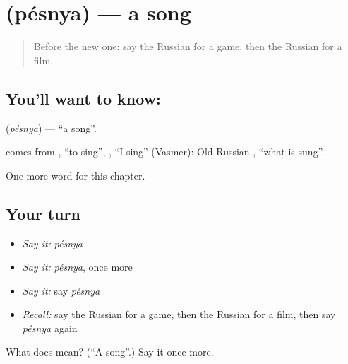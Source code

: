 \section[\texorpdfstring{\ru{песня} (pésnya)}{песня (pésnya)}]{ (pésnya) — a song}

\label{lesson:RU-C113-song}



\begin{quote}
Before the new one: say the Russian for a game, then the Russian for a film.
\end{quote}

\subsection*{You'll want to know: }
\textbf{} (\emph{pésnya}) — \textquotedblleft{}a song\textquotedblright{}.

\begin{cousinweb}
\textbf{} comes from \emph{}, \textquotedblleft{}to sing\textquotedblright{}, \emph{}, \textquotedblleft{}I sing\textquotedblright{} (Vasmer): Old Russian \emph{}, \textquotedblleft{}what is sung\textquotedblright{}.
\end{cousinweb}

\begin{grammarlens}[title={What you've built}]
One more word for this chapter.
\end{grammarlens}

\subsection*{Your turn}
\begin{itemize}
\raggedright
  \item \emph{Say it:} \emph{pésnya}
  \item \emph{Say it:} \emph{pésnya}, once more
  \item \emph{Say it:} say \emph{pésnya}
  \item \emph{Recall:} say the Russian for a game, then the Russian for a film, then say \emph{pésnya} again
\end{itemize}

\begin{tcolorbox}[breakable,colback=teal!4,colframe=teal!35!black,title={Before you move on}]
What does  mean? (\textquotedblleft{}A song\textquotedblright{}.) Say it once more.
\end{tcolorbox}
